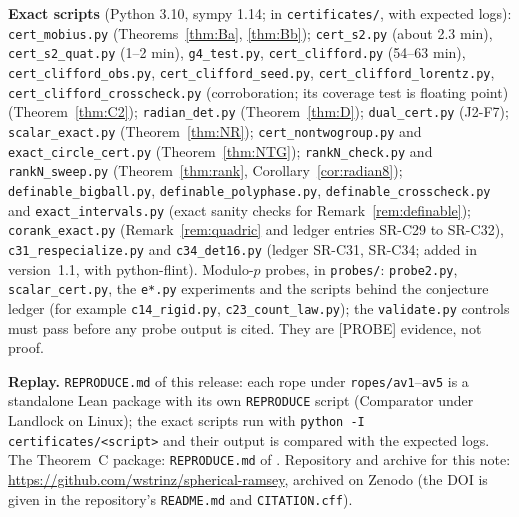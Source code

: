\documentclass[11pt]{amsart}
\newcommand{\st}[1]{\textsf{[#1]}}
\theoremstyle{plain}
\theoremstyle{definition}
\begin{document}
\noindent\textbf{Exact scripts} (Python 3.10, sympy 1.14; in \texttt{certificates/}, with expected logs):
\texttt{cert\_\allowbreak{}mobius.py} (Theorems~\ref{thm:Ba}, \ref{thm:Bb});
\texttt{cert\_\allowbreak{}s2.py} (about 2.3 min), \texttt{cert\_\allowbreak{}s2\_\allowbreak{}quat.py} (1--2 min), \texttt{g4\_\allowbreak{}test.py},
\texttt{cert\_\allowbreak{}clifford.py} (54--63 min), \texttt{cert\_\allowbreak{}clifford\_\allowbreak{}obs.py}, \texttt{cert\_\allowbreak{}clifford\_\allowbreak{}seed.py},
\texttt{cert\_\allowbreak{}clifford\_\allowbreak{}lorentz.py}, \texttt{cert\_\allowbreak{}clifford\_\allowbreak{}crosscheck.py} (corroboration; its coverage test is floating point) (Theorem~\ref{thm:C2});
\texttt{radian\_\allowbreak{}det.py} (Theorem~\ref{thm:D}); \texttt{dual\_\allowbreak{}cert.py} (J2-F7); \texttt{scalar\_\allowbreak{}exact.py}
(Theorem~\ref{thm:NR}); \texttt{cert\_\allowbreak{}nontwogroup.py} and \texttt{exact\_\allowbreak{}circle\_\allowbreak{}cert.py}
(Theorem~\ref{thm:NTG}); \texttt{rankN\_\allowbreak{}check.py} and \texttt{rankN\_\allowbreak{}sweep.py} (Theorem~\ref{thm:rank}, Corollary~\ref{cor:radian8});
\texttt{definable\_\allowbreak{}bigball.py}, \texttt{definable\_\allowbreak{}polyphase.py}, \texttt{definable\_\allowbreak{}crosscheck.py} and \texttt{exact\_\allowbreak{}intervals.py} (exact sanity checks for Remark~\ref{rem:definable});
\texttt{corank\_\allowbreak{}exact.py} (Remark~\ref{rem:quadric} and ledger entries SR-C29 to SR-C32),
\texttt{c31\_\allowbreak{}respecialize.py} and \texttt{c34\_\allowbreak{}det16.py} (ledger SR-C31, SR-C34; added in
version~1.1, with python-flint).
Modulo-$p$ probes, in \texttt{probes/}: \texttt{probe2.py}, \texttt{scalar\_\allowbreak{}cert.py}, the \texttt{e*.py}
experiments and the scripts behind the conjecture ledger (for example \texttt{c14\_\allowbreak{}rigid.py},
\texttt{c23\_\allowbreak{}count\_\allowbreak{}law.py}); the \texttt{validate.py} controls must pass before any
probe output is cited. They are \st{PROBE} evidence, not proof.

\noindent\textbf{Replay.} \texttt{REPRODUCE.md} of this release: each rope under \texttt{ropes/av1}--\texttt{av5}
is a standalone Lean package with its own \texttt{REPRODUCE} script (Comparator under Landlock on Linux); the
exact scripts run with \texttt{python -I certificates/<script>} and their output is compared with the
expected logs. The Theorem~C package: \texttt{REPRODUCE.md} of \cite{MR}. Repository and archive for this
note: \url{https://github.com/wstrinz/spherical-ramsey}, archived on Zenodo (the DOI is given in
the repository's \texttt{README.md} and \texttt{CITATION.cff}).
\end{document}

